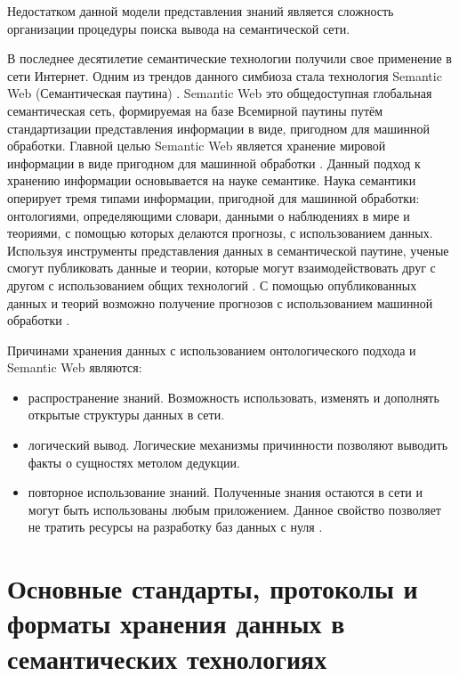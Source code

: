 Недостатком данной модели представления знаний является сложность организации процедуры поиска вывода на семантической сети.

В последнее десятилетие семантические технологии получили свое применение в сети Интернет. Одним из трендов данного симбиоза стала технология Semantic Web (Семантическая паутина) \cite{shadbolt2006semantic}. Semantic Web это общедоступная глобальная семантическая сеть, формируемая на базе Всемирной паутины путём стандартизации представления информации в виде, пригодном для машинной обработки. Главной целью Semantic Web является хранение мировой информации в виде пригодном для машинной обработки \cite{berners2001semantic}. Данный подход к хранению информации основывается на науке семантике. Наука семантики оперирует тремя типами информации, пригодной для машинной обработки: онтологиями, определяющими словари, данными о наблюдениях в мире и теориями, с помощью которых делаются прогнозы, с использованием данных. Используя инструменты представления данных в семантической паутине, ученые смогут публиковать данные и теории, которые могут взаимодействовать друг с другом с использованием общих технологий \cite{hendler2003science}. С помощью опубликованных данных и теорий возможно получение прогнозов с использованием машинной обработки \cite{poole2008semantic}. 

Причинами хранения данных с использованием онтологического подхода и Semantic Web являются:

\begin{itemize}
\item распространение знаний. Возможность использовать, изменять и дополнять открытые структуры данных в сети.
\item логический вывод. Логические механизмы причинности позволяют выводить факты о сущностях метолом дедукции.
\item повторное использование знаний. Полученные знания остаются в сети и могут быть использованы любым приложением. Данное свойство позволяет не тратить ресурсы на разработку баз данных с нуля \cite{wang2004ontology}. 
\end{itemize}


\section{Основные стандарты, протоколы и форматы хранения данных в семантических технологиях} \label{sect1_4}


